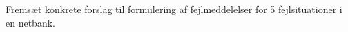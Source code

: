 \documentclass[12pt]{article}
\begin{document}

\clearpage\maketitle
\thispagestyle{empty}

\newpage


\thispagestyle{empty}

\pagestyle{plain}
\setcounter{page}{1}

\section*{} Fremsæt konkrete forslag til formulering af fejlmeddelelser
           for 5 fejlsituationer i en netbank.
\end{document}
